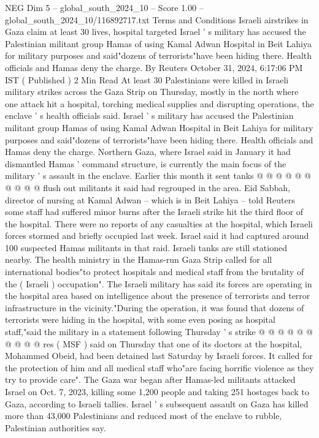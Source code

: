 \begin{textsample}{NEG Dim 5 – global\_south\_2024\_10 – Score 1.00 – global\_south\_2024\_10/116892717.txt}  \label{ex:f5_neg_103}
Terms and Conditions Israeli airstrikes in Gaza claim at least 30 lives, hospital targeted Israel ' s military has accused the Palestinian militant group Hamas of using Kamal Adwan Hospital in Beit Lahiya for military purposes and said"dozens of terrorists"have been hiding there.
Health officials and Hamas deny the charge.
By Reuters October 31, 2024, 6:17:06 PM IST ( Published ) 2 Min Read At least 30 Palestinians were killed in Israeli military strikes across the Gaza Strip on Thursday, mostly in the north where one attack hit a hospital, torching medical supplies and disrupting operations, the enclave ' s health officials said.
Israel ' s military has accused the Palestinian militant group Hamas of using Kamal Adwan Hospital in Beit Lahiya for military purposes and said"dozens of terrorists"have been hiding there.
Health officials and Hamas deny the charge.
Northern Gaza, where Israel said in January it had dismantled Hamas ' command structure, is currently the main focus of the military ' s assault in the enclave.
Earlier this month it sent tanks @ @ @ @ @ @ @ @ @ @ flush out militants it said had regrouped in the area.
Eid Sabbah, director of nursing at Kamal Adwan -- which is in Beit Lahiya -- told Reuters some staff had suffered minor burns after the Israeli strike hit the third floor of the hospital.
There were no reports of any casualties at the hospital, which Israeli forces stormed and briefly occupied last week.
Israel said it had captured around 100 suspected Hamas militants in that raid.
Israeli tanks are still stationed nearby.
The health ministry in the Hamas-run Gaza Strip called for all international bodies"to protect hospitals and medical staff from the brutality of the ( Israeli ) occupation".
The Israeli military has said its forces are operating in the hospital area based on intelligence about the presence of terrorists and terror infrastructure in the vicinity."During the operation, it was found that dozens of terrorists were hiding in the hospital, with some even posing as hospital staff,"said the military in a statement following Thursday ' s strike @ @ @ @ @ @ @ @ @ @ res ( MSF ) said on Thursday that one of its doctors at the hospital, Mohammed Obeid, had been detained last Saturday by Israeli forces.
It called for the protection of him and all medical staff who"are facing horrific violence as they try to provide care".
The Gaza war began after Hamas-led militants attacked Israel on Oct. 7, 2023, killing some 1,200 people and taking 251 hostages back to Gaza, according to Israeli tallies.
Israel ' s subsequent assault on Gaza has killed more than 43,000 Palestinians and reduced most of the enclave to rubble, Palestinian authorities say.

\end{textsample}
